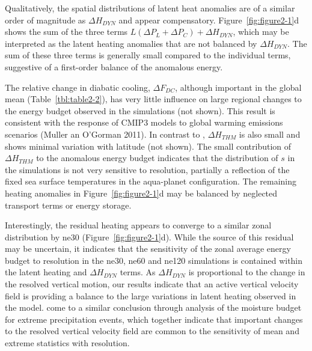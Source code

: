 Qualitatively, the spatial distributions of latent heat anomalies are of a similar order of magnitude as $\Delta H_{DYN}$ and appear compensatory. Figure~\ref{fig:figure2-1}d shows the sum of the three terms $L(\Delta P_L + \Delta P_C) + \Delta H_{DYN}$, which may be interpreted as the latent heating anomalies that are not balanced by $\Delta H_{DYN}$. The sum of these three terms is generally small compared to the individual terms, suggestive of a first-order balance of the anomalous energy. 

The relative change in diabatic cooling, $\Delta F_{DC}$, although important in the global mean (Table~\ref{tbl:table2-2}), has very little influence on large regional changes to the energy budget observed in the simulations (not shown). This result is consistent with the response of CMIP3 models to global warming emissions scenarios (Muller an O’Gorman 2011). In contrast to \cite{MO2011NATUREC}, $\Delta H_{THM}$ is also small and shows minimal variation with latitude (not shown). The small contribution of $\Delta H_{THM}$ to the anomalous energy budget indicates that the distribution of $s$ in the simulations is not very sensitive to resolution, partially a reflection of the fixed sea surface temperatures in the aqua-planet configuration. The remaining heating anomalies in Figure~\ref{fig:figure2-1}d may be balanced by neglected transport terms or energy storage.

Interestingly, the residual heating appears to converge to a similar zonal distribution by ne30 (Figure~\ref{fig:figure2-1}d). While the source of this residual may be uncertain, it indicates that the sensitivity of the zonal average energy budget to resolution in the ne30, ne60 and ne120 simulations is contained within the latent heating and $\Delta H_{DYN}$ terms. As $\Delta H_{DYN}$ is proportional to the change in the resolved vertical motion, our results indicate that an active vertical velocity field is providing a balance to the large variations in latent heating observed in the model. \cite{YETAL2014JCLIM} come to a similar conclusion through analysis of the moisture budget for extreme precipitation events, which together indicate that important changes to the resolved vertical velocity field are common to the sensitivity of mean and extreme statistics with resolution.

